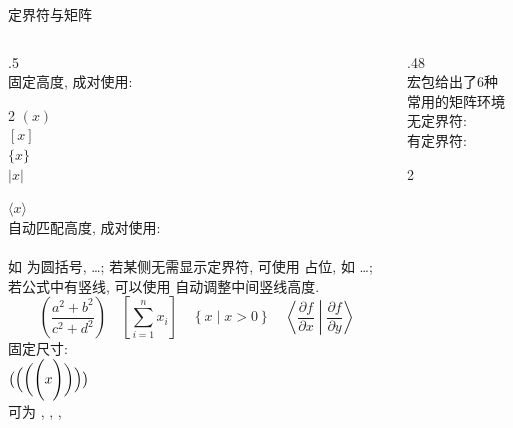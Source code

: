 \begin{frame}{定界符与矩阵}
	\begin{columns}[T, onlytextwidth]
		\begin{column}{.5\columnwidth}
			\\[1ex]
			固定高度, 成对使用:\\\vspace*{-2ex}
			\begin{multicols}{2}
				\fverb{(}\fverb{)} \hfill $(x)$\\[.5ex]
				\fverb{[}\fverb{]} \hfill $[x]$\\[.5ex]
				\cmd{\{}\cmd{\}} \hfill $\{x\}$\\[.5ex]
				\fverb{|}\fverb{|} \hfill $|x|$\\
			\end{multicols}\vspace*{-2ex}
			 \hfill $\langle x \rangle$\\[2ex]
			自动匹配高度, 成对使用:\\[.5ex]
			\\[.5ex]
			如  为圆括号, \ldots{}; 若某侧无需显示定界符, 可使用  占位, 如 \ldots{}; 若公式中有竖线, 可以使用  自动调整中间竖线高度.
			\vspace*{-1ex}\[
				\left(\frac{a^2+b^2}{c^2+d^2}\right) \quad
				\left[\sum_{i=1}^{n} x_i\right] \quad
				\left\{x \mid x>0\right\} \quad
				\left\langle \frac{\partial f}{\partial x} \middle| \frac{\partial f}{\partial y} \right\rangle
			\]\vspace*{-1ex}
			固定尺寸:\\[.5ex]
			 \hfill $\bigl( \Bigl( \biggl( \Biggl( x \Biggr) \biggr) \Bigr) \bigr)$\\[-1.5ex]
			 可为 , , , \cmd{Bigg}
		\end{column}
		\begin{column}{.48\columnwidth}
			\structure{矩阵}\\[1ex]
			 宏包给出了6种常用的矩阵环境\\[.5ex]
			无定界符: \\[.5ex]
			有定界符: \\\vspace*{-2ex}
			\begin{multicols}{2}

\end{multicols}
\end{column}
\end{columns}
\end{frame}
